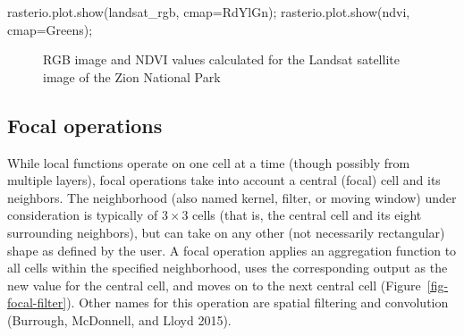 \documentclass[
  letterpaper,
]{krantz}
\newenvironment{Shaded}{\begin{snugshade}}{\end{snugshade}}
\newcommand{\NormalTok}[1]{\textcolor[rgb]{0.00,0.23,0.31}{#1}}
\newcommand{\OperatorTok}[1]{\textcolor[rgb]{0.37,0.37,0.37}{#1}}
\newcommand{\StringTok}[1]{\textcolor[rgb]{0.13,0.47,0.30}{#1}}
\begin{document}
\begin{Shaded}
\begin{Highlighting}[]
\NormalTok{rasterio.plot.show(landsat\_rgb, cmap}\OperatorTok{=}\StringTok{\textquotesingle{}RdYlGn\textquotesingle{}}\NormalTok{)}\OperatorTok{;}
\NormalTok{rasterio.plot.show(ndvi, cmap}\OperatorTok{=}\StringTok{\textquotesingle{}Greens\textquotesingle{}}\NormalTok{)}\OperatorTok{;}
\end{Highlighting}
\end{Shaded}

\begin{figure}

\begin{minipage}{0.50\linewidth}



\end{minipage}%
%
\begin{minipage}{0.50\linewidth}



\end{minipage}%

\caption{\label{fig-raster-ndvi}RGB image and NDVI values calculated for
the Landsat satellite image of the Zion National Park}

\end{figure}%

\subsection{Focal operations}\label{sec-focal-operations}

While local functions operate on one cell at a time (though possibly
from multiple layers), focal operations take into account a central
(focal) cell and its neighbors. The neighborhood (also named kernel,
filter, or moving window) under consideration is typically of
\(3 \times 3\) cells (that is, the central cell and its eight
surrounding neighbors), but can take on any other (not necessarily
rectangular) shape as defined by the user. A focal operation applies an
aggregation function to all cells within the specified neighborhood,
uses the corresponding output as the new value for the central cell, and
moves on to the next central cell (Figure~\ref{fig-focal-filter}). Other
names for this operation are spatial filtering and convolution
(Burrough, McDonnell, and Lloyd 2015).
\end{document}
